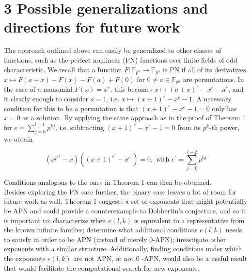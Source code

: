 \documentclass[10pt]{article}
\begin{document}
\section*{3 Possible generalizations and directions for future work}
The approach outlined above can easily be generalized to other classes of functions, such as the perfect nonlinear (PN) functions over finite fields of odd characteristic. We recall that a function $F: \mathbb{F}_{p^{n}} \rightarrow \mathbb{F}_{p^{n}}$ is PN if all of its derivatives $x \mapsto F(a+x)-F(x)-F(a)+F(0)$ for $0 \neq a \in \mathbb{F}_{p^{n}}$ are permutations. In the case of a monomial $F(x)=x^{e}$, this becomes $x \mapsto(a+x)^{e}-x^{e}-a^{e}$, and it clearly enough to consider $a=1$, i.e. $x \mapsto(x+1)^{e}-x^{e}-1$. A necessary condition for this to be a permutation is that $(x+1)^{e}-x^{e}-1=0$ only has $x=0$ as a solution. By applying the same approach as in the proof of Theorem 1 for $e=\sum_{j=0}^{l-1} p^{k j}$, i.e. subtracting $(x+1)^{e}-x^{e}-1=0$ from its $p^{k}$-th power, we obtain

$$
\left(x^{p^{l k}}-x\right)\left((x+1)^{e^{\prime}}-x^{e^{\prime}}\right)=0, \text { with } e^{\prime}=\sum_{j=0}^{l-2} p^{k j}
$$

Conditions analogous to the ones in Theorem 1 can then be obtained.\\
Besides exploring the PN case further, the binary case leaves a lot of room for future work as well. Theorem 1 suggests a set of exponents that might potentially be APN and could provide a counterexample to Dobbertin's conjecture, and so it is important to: characterize when $e(l, k)$ is equivalent to a representative from the known infinite families; determine what additional conditions $e(l, k)$ needs to satisfy in order to be APN (instead of merely 0-APN); investigate other exponents with a similar structure. Additionally, finding conditions under which the exponents $e(l, k)$ are not APN, or not 0 -APN, would also be a useful result that would facilitate the computational search for new exponents.
\end{document}
